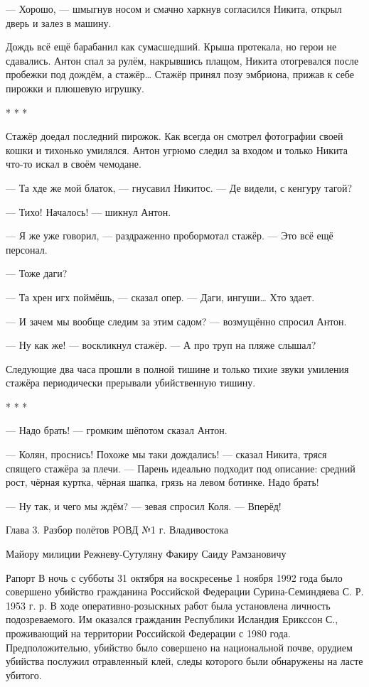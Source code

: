 --- Хорошо, --- шмыгнув носом и смачно харкнув согласился Никита, открыл дверь и залез в машину.


Дождь всё ещё барабанил как сумасшедший. Крыша протекала, но герои не сдавались. Антон спал за рулём, накрывшись плащом, Никита отогревался после пробежки под дождём, а стажёр… Стажёр принял позу эмбриона, прижав к себе пирожки и плюшевую игрушку.


\begin{center}* * *\end{center}


Стажёр доедал последний пирожок. Как всегда он смотрел фотографии своей кошки и тихонько умилялся. Антон угрюмо следил за входом и только Никита что-то искал в своём чемодане.

--- Та хде же мой блаток, --- гнусавил Никитос. --- Де видели, с кенгуру тагой?

--- Тихо! Началось! --- шикнул Антон.

--- Я же уже говорил, --- раздраженно пробормотал стажёр. --- Это всё ещё персонал.

--- Тоже даги?

--- Та хрен игх поймёшь, --- сказал опер. --- Даги, ингуши… Хто здает.

--- И зачем мы вообще следим за этим садом? --- возмущённо спросил Антон.

--- Ну как же! --- воскликнул стажёр. --- А про труп на пляже слышал?


Следующие два часа прошли в полной тишине и только тихие звуки умиления стажёра периодически прерывали убийственную тишину. 


\begin{center}* * *\end{center}

--- Надо брать! --- громким шёпотом сказал Антон.

--- Колян, проснись! Похоже мы таки дождались! --- сказал Никита, тряся спящего стажёра за плечи. --- Парень идеально подходит под описание: средний рост, чёрная куртка, чёрная шапка, грязь на левом ботинке. Надо брать!

--- Ну так, и чего мы ждём? --- зевая спросил Коля. --- Вперёд!


Глава 3. Разбор полётов
РОВД №1 г. Владивостока


Майору милиции Режневу-Сутуляну Факиру Саиду Рамзановичу


Рапорт
В ночь с субботы 31 октября на воскресенье 1 ноября 1992 года было совершено убийство гражданина Российской Федерации Сурина-Семиндяева С. Р. 1953 г. р. В ходе оперативно-розыскных работ была установлена личность подозреваемого. Им оказался гражданин Республики Исландия Ерикссон С., проживающий на территории Российской Федерации с 1980 года. Предположительно, убийство было совершено на национальной почве, орудием убийства послужил отравленный клей, следы которого были обнаружены на ласте убитого.



